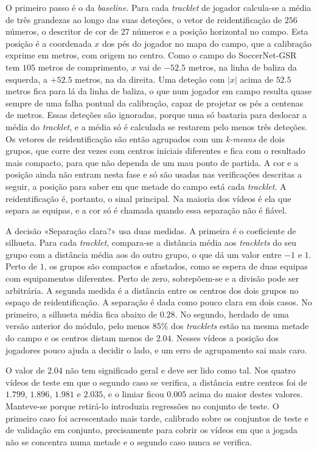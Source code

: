O primeiro passo é o da \emph{baseline}. Para cada \emph{tracklet} de jogador calcula-se a média de três grandezas ao longo das suas deteções, o vetor de reidentificação de $256$ números, o descritor de cor de $27$ números e a posição horizontal no campo. Esta posição é a coordenada $x$ dos pés do jogador no mapa do campo, que a calibração exprime em metros, com origem no centro. Como o campo do SoccerNet-GSR tem $105$ metros de comprimento, $x$ vai de $-52.5$ metros, na linha de baliza da esquerda, a $+52.5$ metros, na da direita. Uma deteção com $|x|$ acima de $52.5$ metros fica para lá da linha de baliza, o que num jogador em campo resulta quase sempre de uma falha pontual da calibração, capaz de projetar os pés a centenas de metros. Essas deteções são ignoradas, porque uma só bastaria para deslocar a média do \emph{tracklet}, e a média só é calculada se restarem pelo menos três deteções. Os vetores de reidentificação são então agrupados com um \emph{k-means} de dois grupos, que corre dez vezes com centros iniciais diferentes e fica com o resultado mais compacto, para que não dependa de um mau ponto de partida. A cor e a posição ainda não entram nesta fase e só são usadas nas verificações descritas a seguir, a posição para saber em que metade do campo está cada \emph{tracklet}. A reidentificação é, portanto, o sinal principal. Na maioria dos vídeos é ela que separa as equipas, e a cor só é chamada quando essa separação não é fiável.


A decisão «Separação clara?» usa duas medidas. A primeira é o coeficiente de silhueta. Para cada \emph{tracklet}, compara-se a distância média aos \emph{tracklets} do seu grupo com a distância média aos do outro grupo, o que dá um valor entre $-1$ e $1$. Perto de $1$, os grupos são compactos e afastados, como se espera de duas equipas com equipamentos diferentes. Perto de zero, sobrepõem-se e a divisão pode ser arbitrária. A segunda medida é a distância entre os centros dos dois grupos no espaço de reidentificação. A separação é dada como pouco clara em dois casos. No primeiro, a silhueta média fica abaixo de $0.28$. No segundo, herdado de uma versão anterior do módulo, pelo menos $85\%$ dos \emph{tracklets} estão na mesma metade do campo e os centros distam menos de $2.04$. Nesses vídeos a posição dos jogadores pouco ajuda a decidir o lado, e um erro de agrupamento sai mais caro.

O valor de $2.04$ não tem significado geral e deve ser lido como tal. Nos quatro vídeos de teste em que o segundo caso se verifica, a distância entre centros foi de $1.799$, $1.896$, $1.981$ e $2.035$, e o limiar ficou $0.005$ acima do maior destes valores. Manteve-se porque retirá-lo introduzia regressões no conjunto de teste. O primeiro caso foi acrescentado mais tarde, calibrado sobre os conjuntos de teste e de validação em conjunto, precisamente para cobrir os vídeos em que a jogada não se concentra numa metade e o segundo caso nunca se verifica.

